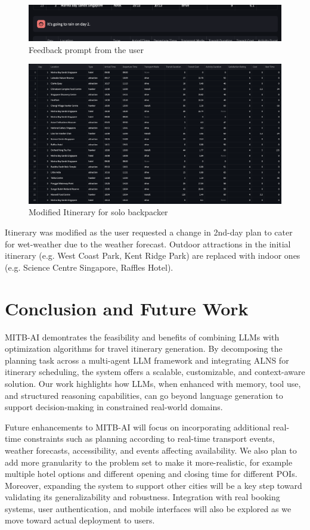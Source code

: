 \documentclass{ecai}
\begin{document}
\begin{figure}[H]
    \centering
    \includegraphics[width=0.75\linewidth]{feedback_prompt.png}
    \caption{Feedback prompt from the user}
    \label{fig:enter-label}
\end{figure}
\vspace{-0.4cm}

\begin{figure}[H]
    \centering
    \includegraphics[width=0.75\linewidth]{itinerary_modified.png}
    \caption{Modified Itinerary for solo backpacker}
    \label{fig:enter-label}
\end{figure}

Itinerary was modified as the user requested a change in 2nd-day plan to cater for wet-weather due to the weather forecast. Outdoor attractions in the initial itinerary (e.g. West Coast Park, Kent Ridge Park) are replaced with indoor ones (e.g. Science Centre Singapore, Raffles Hotel).

\section{Conclusion and Future Work}
MITB-AI demontrates the feasibility and benefits of combining LLMs with optimization algorithms for travel itinerary generation. By decomposing the planning task across a multi-agent LLM framework and integrating ALNS for itinerary scheduling, the system offers a scalable, customizable, and context-aware solution. Our work highlights how LLMs, when enhanced with memory, tool use, and structured reasoning capabilities, can go beyond language generation to support decision-making in constrained real-world domains.

Future enhancements to MITB-AI will focus on incorporating additional real-time constraints such as planning according to real-time transport events, weather forecasts, accessibility, and events affecting availability. We also plan to add more granularity to the problem set to make it more-realistic, for example multiple hotel options and different opening and closing time for different POIs. Moreover, expanding the system to support other cities will be a key step toward validating its generalizability and robustness. Integration with real booking systems, user authentication, and mobile interfaces will also be explored as we move toward actual deployment to users. 
\end{document}
